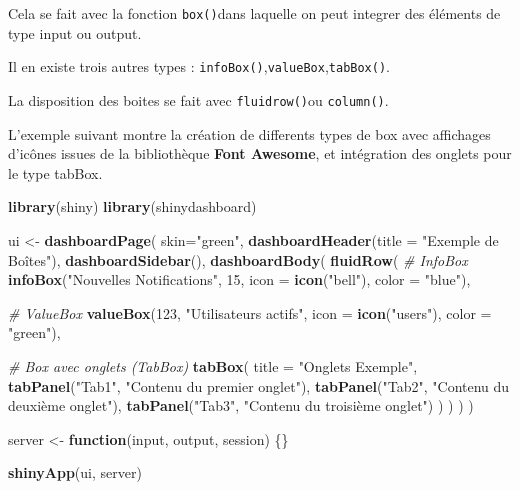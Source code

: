 \documentclass[
]{article}
\newenvironment{Shaded}{\begin{snugshade}}{\end{snugshade}}
\newcommand{\AttributeTok}[1]{\textcolor[rgb]{0.13,0.29,0.53}{#1}}
\newcommand{\CommentTok}[1]{\textcolor[rgb]{0.56,0.35,0.01}{\textit{#1}}}
\newcommand{\ControlFlowTok}[1]{\textcolor[rgb]{0.13,0.29,0.53}{\textbf{#1}}}
\newcommand{\DecValTok}[1]{\textcolor[rgb]{0.00,0.00,0.81}{#1}}
\newcommand{\FunctionTok}[1]{\textcolor[rgb]{0.13,0.29,0.53}{\textbf{#1}}}
\newcommand{\NormalTok}[1]{#1}
\newcommand{\OtherTok}[1]{\textcolor[rgb]{0.56,0.35,0.01}{#1}}
\newcommand{\StringTok}[1]{\textcolor[rgb]{0.31,0.60,0.02}{#1}}
\begin{document}
Cela se fait avec la fonction \texttt{box()}dans laquelle on peut
integrer des éléments de type input ou output.

Il en existe trois autres types :
\texttt{infoBox()},\texttt{valueBox},\texttt{tabBox()}.

La disposition des boites se fait avec \texttt{fluidrow()}ou
\texttt{column()}.

L'exemple suivant montre la création de differents types de box avec
affichages d'icônes issues de la bibliothèque \textbf{Font Awesome}, et
intégration des onglets pour le type tabBox.

\begin{Shaded}
\begin{Highlighting}[]
\FunctionTok{library}\NormalTok{(shiny)}
\FunctionTok{library}\NormalTok{(shinydashboard)}

\NormalTok{ui }\OtherTok{\textless{}{-}} \FunctionTok{dashboardPage}\NormalTok{(}
  \AttributeTok{skin=}\StringTok{"green"}\NormalTok{,}
  \FunctionTok{dashboardHeader}\NormalTok{(}\AttributeTok{title =} \StringTok{"Exemple de Boîtes"}\NormalTok{),}
  \FunctionTok{dashboardSidebar}\NormalTok{(),}
  \FunctionTok{dashboardBody}\NormalTok{(}
    \FunctionTok{fluidRow}\NormalTok{(}
      \CommentTok{\# InfoBox}
      \FunctionTok{infoBox}\NormalTok{(}\StringTok{"Nouvelles Notifications"}\NormalTok{, }\DecValTok{15}\NormalTok{, }\AttributeTok{icon =} \FunctionTok{icon}\NormalTok{(}\StringTok{"bell"}\NormalTok{), }\AttributeTok{color =} \StringTok{"blue"}\NormalTok{),}
      
      \CommentTok{\# ValueBox}
      \FunctionTok{valueBox}\NormalTok{(}\DecValTok{123}\NormalTok{, }\StringTok{"Utilisateurs actifs"}\NormalTok{, }\AttributeTok{icon =} \FunctionTok{icon}\NormalTok{(}\StringTok{"users"}\NormalTok{), }\AttributeTok{color =} \StringTok{"green"}\NormalTok{),}
      
      \CommentTok{\# Box avec onglets (TabBox)}
      \FunctionTok{tabBox}\NormalTok{(}
        \AttributeTok{title =} \StringTok{"Onglets Exemple"}\NormalTok{, }
        \FunctionTok{tabPanel}\NormalTok{(}\StringTok{"Tab1"}\NormalTok{, }\StringTok{"Contenu du premier onglet"}\NormalTok{),}
        \FunctionTok{tabPanel}\NormalTok{(}\StringTok{"Tab2"}\NormalTok{, }\StringTok{"Contenu du deuxième onglet"}\NormalTok{),}
        \FunctionTok{tabPanel}\NormalTok{(}\StringTok{"Tab3"}\NormalTok{, }\StringTok{"Contenu du troisième onglet"}\NormalTok{)}
\NormalTok{      )}
\NormalTok{    )}
\NormalTok{  )}
\NormalTok{)}

\NormalTok{server }\OtherTok{\textless{}{-}} \ControlFlowTok{function}\NormalTok{(input, output, session) \{\}}

\FunctionTok{shinyApp}\NormalTok{(ui, server)}
\end{Highlighting}
\end{Shaded}
\end{document}
